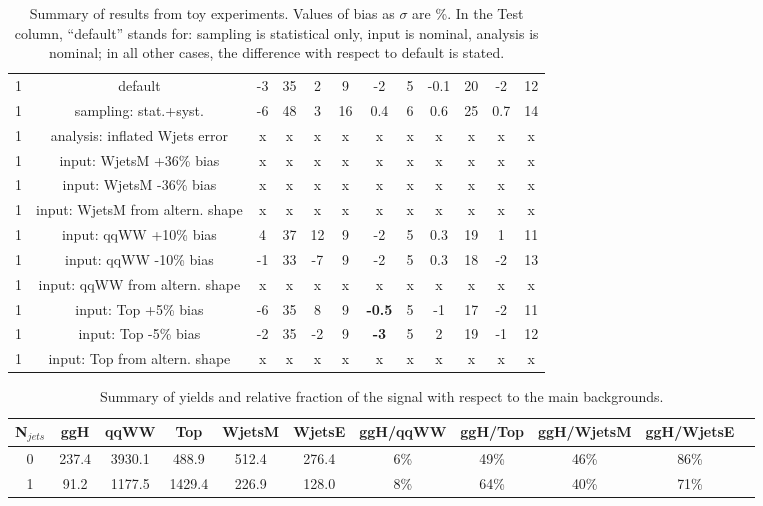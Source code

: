 \begin{table}
\begin{center}
\begin{tabular}{c | c  | c c | c c | c c | c c | c c }
\hline
\hline
1 & default                             & -3  & 35 & 2   & 9  & -2  & 5 & -0.1 & 20 & -2 & 12 \\
1 & sampling: stat.+syst.               & -6  & 48 & 3   & 16 & 0.4 & 6 & 0.6  & 25 & 0.7& 14 \\
\hline
1 & analysis: inflated Wjets error      &  x  &  x & x   & x & x   & x  & x   & x  & x   & x\\ 
1 & input: WjetsM +36\% bias             &  x  &  x & x   & x & x   & x  & x   & x  & x   & x\\ 
1 & input: WjetsM -36\% bias             &  x  &  x & x   & x & x   & x  & x   & x  & x   & x\\ 
1 & input: WjetsM from altern. shape     &  x  &  x & x   & x & x   & x  & x   & x  & x   & x\\
\hline
1 & input: qqWW +10\% bias              & 4   & 37 & 12  & 9 & -2  & 5  & 0.3  & 19 & 1  & 11 \\
1 & input: qqWW -10\% bias              & -1  & 33 & -7  & 9 & -2  & 5  & 0.3  & 18 & -2 & 13 \\
1 & input: qqWW from altern. shape      & x   & x  & x   & x & x   & x  & x    & x  & x & x \\
\hline
1 & input: Top +5\% bias                & -6  & 35  & 8  & 9 & {\bf -0.5} & 5 & -1  & 17 & -2 & 11 \\
1 & input: Top -5\% bias                & -2  & 35 & -2  & 9 & {\bf -3} & 5 & 2  & 19 & -1 & 12 \\
1 & input: Top from altern. shape       & x   & x  & x & x & x & x & x  & x & x & x \\
\hline
\hline
\end{tabular}
\caption{Summary of results from toy experiments. Values of bias as $\sigma$ are \%.
In the Test column, ``default'' stands for: sampling is statistical only, input is nominal, analysis is nominal; 
in all other cases, the difference with respect to default is stated.}
\label{tab:toy_summary}
\end{center}
\end{table}


\begin{table}
\begin{center}
\begin{tabular}{c | c c c c c | c  c  c c c }
\hline
N$_{jets}$ & ggH & qqWW & Top & WjetsM & WjetsE & ggH/qqWW & ggH/Top & ggH/WjetsM & ggH/WjetsE \\
\hline
0 & 237.4 & 3930.1 & 488.9  & 512.4 & 276.4 & 6\% & 49\% & 46\% &  86\%\\
1 & 91.2  & 1177.5 & 1429.4 & 226.9 & 128.0 & 8\% & 64\% & 40\% &  71\%\\
\hline
\end{tabular}
\caption{Summary of yields and relative fraction of the signal with respect to the main backgrounds.}
\label{tab:yield_summary}
\end{center}
\end{table}


